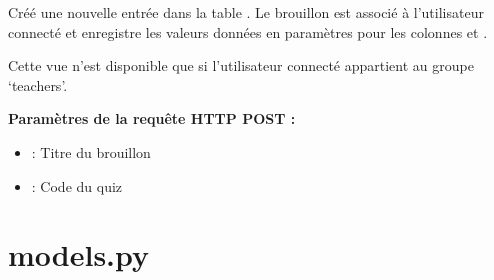 \documentclass[a4,10pt,french]{sphinxmanual}
\begin{document}

\begin{fulllineitems}
\label{source:quiz.views.savedraft}
Créé une nouvelle entrée dans la table . Le brouillon est associé
à l'utilisateur connecté et enregistre les valeurs données en paramètres pour
les colonnes  et .

Cette vue n'est disponible que si l'utilisateur connecté appartient au groupe
`teachers'.

\textbf{Paramètres de la requête HTTP POST :}
\begin{itemize}
\item {} 
 : Titre du brouillon

\item {} 
 : Code du quiz

\end{itemize}

\end{fulllineitems}



\section{models.py}
\label{source:models-py}\label{source:module-quiz.models}
\end{document}
